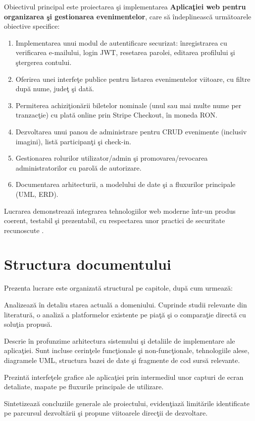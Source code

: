 Obiectivul principal este proiectarea \c si implementarea \textbf{Aplica\c tiei web pentru organizarea \c si gestionarea evenimentelor}, care s\u a \^indeplineasc\u a urm\u atoarele obiective specifice:

\begin{enumerate}
	\item Implementarea unui modul de autentificare securizat: \^inregistrarea cu verificarea e-mailului, login JWT, resetarea parolei, editarea profilului \c si \c stergerea contului.
	\item Oferirea unei interfe\c te publice pentru listarea evenimentelor viitoare, cu filtre dup\u a nume, jude\c t \c si dat\u a.
	\item Permiterea achizi\c tion\u arii biletelor nominale (unul sau mai multe nume per tranzac\c tie) cu plat\u a online prin Stripe Checkout, \^in moneda RON.
	\item Dezvoltarea unui panou de administrare pentru CRUD evenimente (inclusiv imagini), list\u a participan\c ti \c si check-in.
	\item Gestionarea rolurilor utilizator/admin \c si promovarea/revocarea administratorilor cu parol\u a de autorizare.
	\item Documentarea arhitecturii, a modelului de date \c si a fluxurilor principale (UML, ERD).
\end{enumerate}

Lucrarea demonstreaz\u a integrarea tehnologiilor web moderne \^intr-un produs coerent, testabil \c si prezentabil, cu respectarea unor practici de securitate recunoscute \cite{fowler2002}.


\section{Structura documentului}

Prezenta lucrare este organizat\u a structural pe capitole, dup\u a cum urmeaz\u a:

\vspace{0.2cm}
\begin{description}
	\setlength{\itemsep}{0.3cm}
	\item[Capitolul 2] Analizeaz\u a \^in detaliu starea actual\u a a domeniului. Cuprinde studii relevante din literatur\u a, o analiz\u a a platformelor existente pe pia\c t\u a \c si o compara\c tie direct\u a cu solu\c tia propus\u a.
	\item[Capitolul 3] Descrie \^in profunzime arhitectura sistemului \c si detaliile de implementare ale aplica\c tiei. Sunt incluse cerin\c tele func\c tionale \c si non-func\c tionale, tehnologiile alese, diagramele UML, structura bazei de date \c si fragmente de cod surs\u a relevante.
	\item[Capitolul 4] Prezint\u a interfe\c tele grafice ale aplica\c tiei prin intermediul unor capturi de ecran detaliate, mapate pe fluxurile principale de utilizare.
	\item[Capitolul 5] Sintetizeaz\u a concluziile generale ale proiectului, eviden\c tiaz\u a limit\u arile identificate pe parcursul dezvolt\u arii \c si propune viitoarele direc\c tii de dezvoltare.
\end{description}


